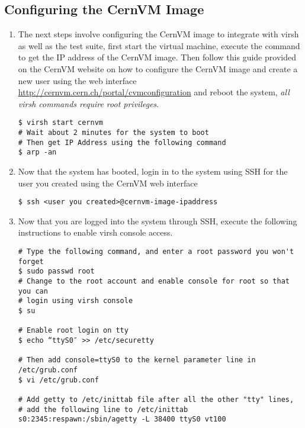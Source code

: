 \newpage
\subsection{Configuring the CernVM Image}
\label{sec:cernvmconfig}
\begin{enumerate}
\item 	The next steps involve configuring the CernVM image to integrate with virsh as well as the test suite, first
		start the virtual machine, execute the command to get the IP address of the CernVM image. Then follow this guide
		provided on the CernVM website on how to configure the CernVM image and create a new user using the web interface 
		\url{http://cernvm.cern.ch/portal/cvmconfiguration} and reboot the system, \emph{all virsh commands require root privileges}.

\begin{lstlisting}
$ virsh start cernvm
# Wait about 2 minutes for the system to boot 
# Then get IP Address using the following command
$ arp -an
\end{lstlisting}

\item Now that the system has booted, login in to the system using SSH for the user you created using the CernVM web interface
\begin{lstlisting}
$ ssh <user you created>@cernvm-image-ipaddress
\end{lstlisting}

\item	Now that you are logged into the system through SSH, execute the following instructions to enable virsh console access.
		
\lstset{language=bash,caption= Enable Virsh Console Access}
\begin{lstlisting}
# Type the following command, and enter a root password you won't forget
$ sudo passwd root
# Change to the root account and enable console for root so that you can 
# login using virsh console
$ su

# Enable root login on tty
$ echo “ttyS0″ >> /etc/securetty

# Then add console=ttyS0 to the kernel parameter line in /etc/grub.conf
$ vi /etc/grub.conf

# Add getty to /etc/inittab file after all the other "tty" lines, 
# add the following line to /etc/inittab
s0:2345:respawn:/sbin/agetty -L 38400 ttyS0 vt100

\end{lstlisting}


\end{enumerate}
